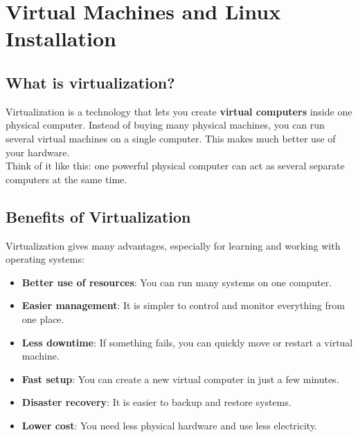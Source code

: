 
\chapter{Virtual Machines and Linux Installation}

\section{What is virtualization?}
Virtualization is a technology that lets you create \textbf{virtual computers} inside one physical computer.
Instead of buying many physical machines, you can run several virtual machines on a single computer.
This makes much better use of your hardware.
\vspace{0.2cm}\\
Think of it like this: one powerful physical computer can act as several separate computers at the same time.

\section{Benefits of Virtualization}
Virtualization gives many advantages, especially for learning and working with operating systems:
\begin{itemize}
    \item \textbf{Better use of resources}: You can run many systems on one computer.
    \item \textbf{Easier management}: It is simpler to control and monitor everything from one place.
    \item \textbf{Less downtime}: If something fails, you can quickly move or restart a virtual machine.
    \item \textbf{Fast setup}: You can create a new virtual computer in just a few minutes.
    \item \textbf{Disaster recovery}: It is easier to backup and restore systems.
    \item \textbf{Lower cost}: You need less physical hardware and use less electricity.
\end{itemize}

